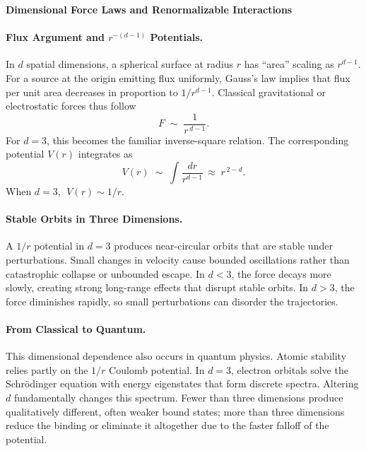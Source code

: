 \begin{technical}
    {\Large \textbf{Dimensional Force Laws and Renormalizable Interactions}}
    
    \paragraph{Flux Argument and $r^{-(d-1)}$ Potentials.}
    In $d$ spatial dimensions, a spherical surface at radius $r$ has ``area'' scaling as $r^{d-1}$. For a source at the origin emitting flux uniformly, Gauss's law implies that flux per unit area decreases in proportion to $1/r^{d-1}$. Classical gravitational or electrostatic forces thus follow 
    $$
    F \;\sim\; \frac{1}{r^{\,d-1}}.
    $$
    For $d=3$, this becomes the familiar inverse-square relation. The corresponding potential $V(r)$ integrates as
    $$
    V(r) \;\sim\; \int \frac{dr}{r^{d-1}} \,\approx\; r^{\,2-d}.
    $$
    When $d=3$, $\;V(r)\sim 1/r$.
    
    \paragraph{Stable Orbits in Three Dimensions.}
    A $1/r$ potential in $d=3$ produces near-circular orbits that are stable under perturbations. Small changes in velocity cause bounded oscillations rather than catastrophic collapse or unbounded escape. In $d<3$, the force decays more slowly, creating strong long-range effects that disrupt stable orbits. In $d>3$, the force diminishes rapidly, so small perturbations can disorder the trajectories.
    
    \paragraph{From Classical to Quantum.}
    This dimensional dependence also occurs in quantum physics. Atomic stability relies partly on the $1/r$ Coulomb potential. In $d=3$, electron orbitals solve the Schrödinger equation with energy eigenstates that form discrete spectra. Altering $d$ fundamentally changes this spectrum. Fewer than three dimensions produce qualitatively different, often weaker bound states; more than three dimensions reduce the binding or eliminate it altogether due to the faster falloff of the potential.
    

\end{technical}
